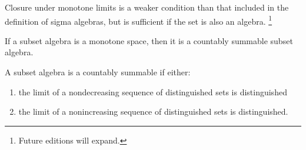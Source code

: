 
Closure under monotone limits is a weaker condition than that included in the definition of sigma algebras, but is sufficient if the set is also an algebra.
  \ifhmode\unskip\fi\footnote{
Future editions will expand.
  }


If a subset algebra is a monotone space, then it is a countably summable subset algebra.

\begin{prop}
A subset algebra is a countably summable if either:
  \begin{enumerate}
  \item the limit of a nondecreasing sequence of distinguished sets is distinguished
  \item the limit of a nonincreasing sequence of distinguished sets is distinguished.
  \end{enumerate}

\end{prop}
\blankpage
